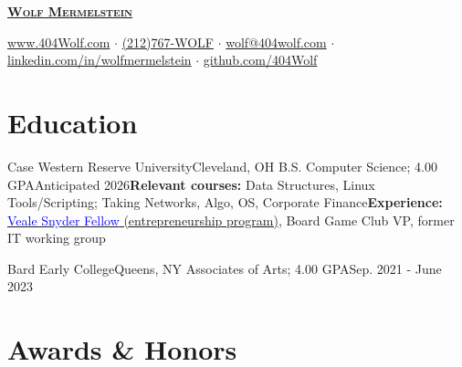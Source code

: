 \documentclass[letterpaper, 10pt]{article}
\begin{document}


\begin{center}
	\textbf{\Huge \scshape \href{https://404wolf.com}{Wolf Mermelstein}} \\ \vspace{4pt}

	\href{https://404wolf.com}{www.404Wolf.com}
	$\cdot$
	\small \href{tel:(+12127679653)}{(212)767-WOLF}
	$\cdot$
	\href{mailto:wolf@404wolf.com}{wolf@404wolf.com}
	$\cdot$
	\href{https://linkedin.com/in/wolfmermelstein}{linkedin.com/in/wolfmermelstein}
	$\cdot$
	\href{https://github.com/404wolf}{github.com/404Wolf}
\end{center}
\vspace{-16px}

\section{Education}
\resumeSubHeadingListStart
\resumeSubheadingCompact
{Case Western Reserve University}{Cleveland, OH}
{B.S. Computer Science; 4.00 GPA}{Anticipated 2026}{\textbf{Relevant courses:} Data Structures, Linux Tools/Scripting; Taking Networks, Algo, OS, Corporate Finance}{\textbf{Experience:} \href{https://case.edu/entrepreneurship/fellowships/veale-snyder-fellows-program}{\textcolor{blue}{Veale Snyder Fellow} (entrepreneurship program)}, Board Game Club VP, former IT working group}

\vspace{3.5pt}

\resumeSubheadingCompact
{Bard Early College}{Queens, NY}
{Associates of Arts;  4.00 GPA}{Sep. 2021 - June 2023}{}{}
\resumeSubHeadingListEnd

\section{Awards \& Honors}
\resumeSubHeadingListStart

\end{document}
